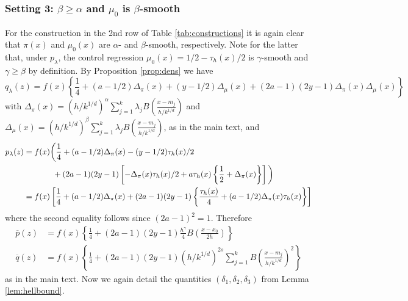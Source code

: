 \documentclass[11pt,twoside]{article}
\theoremstyle{definition}
\theoremstyle{remark}
\begin{document}
\bigskip

\subsubsection{Setting 3: $\beta \geq \alpha$ and $\mu_0$ is $\beta$-smooth}

For the construction in the 2nd row of Table \ref{tab:constructions} it is again clear that $\pi(x)$ and $\mu_0(x)$ are $\alpha$- and $\beta$-smooth, respectively. Note for the latter that, under $p_\lambda$, the control regression $\mu_0(x) = 1/2-\tau_h(x)/2$ is $\gamma$-smooth and $\gamma \geq \beta$ by definition. 
By Proposition \ref{prop:dens} we have
$$ q_\lambda(z) = f(x) \left\{ \frac{1}{4} + (a-1/2) \Delta_\pi(x) + (y-1/2)  \Delta_\mu(x)  + (2a-1)(2y-1)  \Delta_\pi(x) \Delta_\mu(x)   \right\} $$
with $\Delta_\pi(x)= \left(h/k^{1/d} \right)^\alpha \sum_{j=1}^k \lambda_j B\left( \frac{x-m_j}{h/k^{1/d}} \right)$ and $\Delta_\mu(x)= \left(h/k^{1/d} \right)^\beta \sum_{j=1}^k \lambda_j B\left( \frac{x-m_j}{h/k^{1/d}} \right)$, as in the main text, and 
\begin{align*}
p_\lambda(z) &=f(x) \bigg( \frac{1}{4} + (a-1/2) \Delta_\pi(x) - (y-1/2)  \tau_h(x)/2  \\
& \hspace{.5in} + (2a-1)(2y-1) \left[ -\Delta_\pi(x) \tau_h(x)/2 + a \tau_h(x) \left\{ \frac{1}{2} + \Delta_\pi(x) \right\}   \right] \bigg) \\
&= f(x) \left[ \frac{1}{4} + (a-1/2) \Delta_\pi(x) + (2a-1)(2y-1) \left\{ \frac{\tau_h(x)}{4} + (a-1/2) \Delta_\pi(x) \tau_h(x) \right\} \right]
\end{align*}
where the second equality follows since $(2a-1)^2=1$. Therefore
\begin{align*}
\overline{p}(z) &= f(x) \left\{ \frac{1}{4} + (2a-1)(2y-1) \frac{h^\gamma}{4} B\left( \frac{x-x_0}{2h} \right) \right\} \\
\overline{q}(z) &= f(x) \left\{ \frac{1}{4} + (2a-1)(2y-1) \left( h/k^{1/d} \right)^{2s} \sum_{j=1}^k B\left( \frac{x-m_j}{h/k^{1/d}} \right)^2 \right\}  
\end{align*}
as in the main text. 
Now we again detail the quantities $(\delta_1,\delta_2,\delta_3)$ from Lemma \ref{lem:hellbound}. \\
\end{document}
